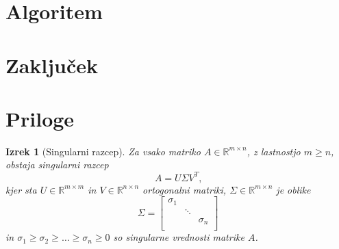 \documentclass[mat1]{article}
\newtheorem{izrek}{Izrek}
\begin{document}
\section{Algoritem}

\section{Zaključek}

\section{Priloge}

\begin{izrek}[Singularni razcep]
\label{izrek:SVD} Za vsako matriko $A \in \mathbb{R}^{m \times n}$, z lastnostjo $m \geq n$, obstaja singularni razcep 
$$A = U \Sigma V^T \text{,}$$
kjer sta $U \in \mathbb{R}^{m \times m}$ in $V \in \mathbb{R}^{n \times n}$ ortogonalni matriki, $\Sigma \in \mathbb{R}^{m \times n}$ je oblike
$$
\Sigma = 
\begin{bmatrix} 
\sigma_1 &  & \\
 & \ddots & \\
 & & \sigma_n  \\
 & & 
\end{bmatrix}$$
in $\sigma_1 \geq \sigma_2 \geq \ldots \geq \sigma_n \geq 0$ so singularne vrednosti matrike $A$.
\end{izrek}
\end{document}
